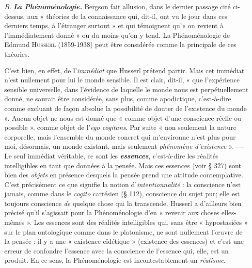 {\it B.} \textbf{\textit {La Phénoménologie.}} Bergson fait allusion, dans le dernier passage
cité ci-dessus, aux « théories de la connaissance qui, dit-il, ont vu
le jour dans ces derniers temps, à l'étranger surtout » et qui témoignent
qu’« on revient à l’immédiatement donné » ou du moins qu’on y tend.
La Phénoménologie de Edmund \textsc{Husserl} (1859-1938) peut être
considérée comme la principale de ces théories.

C’est bien, en effet, de l'{\it immédiat} que Husserl prétend partir. Mais cet
immédiat n’est nullement pour lui le monde sensible. Il est clair, dit-il,
« que l'expérience sensible universelle, dans l’évidence de laquelle le monde
nous est perpétuellement donné, ne saurait être considérée, sans plus,
comme apodictique, c’est-à-dire comme excluant de façon absolue la possibilité 
de douter de l'existence du monde ». Aucun objet ne nous est donné
que « comme objet d’une conscience réelle ou possible », comme objet de
l'{\it ego cogitans}. Par suite « non seulement la nature corporelle, mais l’ensemble
du monde concret qui m’environne n’est plus pour moi, désormais, un monde
existant, mais seulement {\it phénomène d'existence} ». {\bf —} Le seul immédiat
véritable, ce sont les \textbf{\textit {essences}}, c’est-à-dire les réalités intelligibles en tant
que données à la pensée. Mais ces essences (voir § 327) sont bien des {\it objets}
en présence desquels la pensée prend une attitude contemplative. C’est
précisément ce que signifie la notion d’{\it intentionnalité} : la conscience n’est
jamais, comme dans le {\it cogito} cartésien (§ 112), conscience du sujet pur;
elle est toujours conscience {\it de} quelque chose qui la transcende. Husserl a
d’ailleurs bien précisé qu’il s’agissait pour la Phénoménologie d’en « revenir
aux choses elles-mêmes ». Les essences sont des réalités intelligibles qui,
sans être « hypostasiées » sur le plan ontologique comme dans le platonisme,
ne sont nullement l’œuvre de la pensée : il y a une « existence eïdétique »
(existence des essences) et c’est une erreur de confondre l'essence avec la
conscience de l’essence qui, elle, est un produit. En ce sens, la Phénoménologie
est incontestablement un {\it réalisme}.

